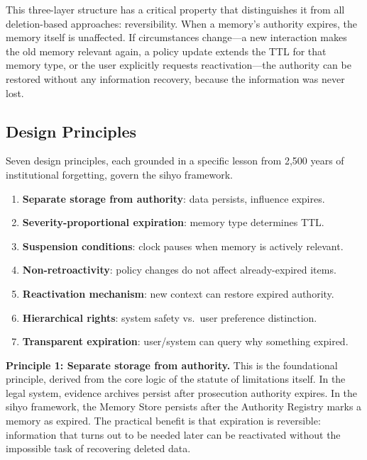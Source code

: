 \documentclass[12pt]{article}
\begin{document}
This three-layer structure has a critical property that distinguishes it from all deletion-based approaches: reversibility. When a memory's authority expires, the memory itself is unaffected. If circumstances change---a new interaction makes the old memory relevant again, a policy update extends the TTL for that memory type, or the user explicitly requests reactivation---the authority can be restored without any information recovery, because the information was never lost.

\subsection{Design Principles}
\label{sec:design-principles}

Seven design principles, each grounded in a specific lesson from 2,500 years of institutional forgetting, govern the sihyo framework.

\begin{enumerate}
  \item \textbf{Separate storage from authority}: data persists, influence expires.
  \item \textbf{Severity-proportional expiration}: memory type determines TTL.
  \item \textbf{Suspension conditions}: clock pauses when memory is actively relevant.
  \item \textbf{Non-retroactivity}: policy changes do not affect already-expired items.
  \item \textbf{Reactivation mechanism}: new context can restore expired authority.
  \item \textbf{Hierarchical rights}: system safety vs.\ user preference distinction.
  \item \textbf{Transparent expiration}: user/system can query why something expired.
\end{enumerate}

\textbf{Principle 1: Separate storage from authority.} This is the foundational principle, derived from the core logic of the statute of limitations itself. In the legal system, evidence archives persist after prosecution authority expires. In the sihyo framework, the Memory Store persists after the Authority Registry marks a memory as expired. The practical benefit is that expiration is reversible: information that turns out to be needed later can be reactivated without the impossible task of recovering deleted data.
\end{document}
